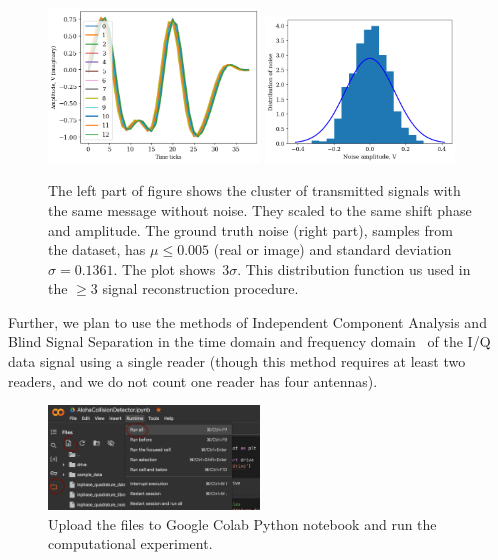 \documentclass[12pt]{article}
\begin{document}
\begin{figure}[!h]
\centering
\includegraphics[width=0.5\textwidth]{fig_cluster}
\includegraphics[width=0.45\textwidth]{fig_noise_pdf}
\caption{The left part of figure shows the cluster of transmitted signals with the same message without noise. They scaled to the same shift phase and amplitude.  The ground truth noise (right part), samples from the dataset, has $\mu\leq 0.005$ (real or image) and standard deviation~$\sigma =  0.1361$. The plot shows~$3 \sigma$. This distribution function us used in the $\geq 3$ signal reconstruction procedure. }  %
\label{fig:demo}
\end{figure}

Further, we plan to use the methods of Independent Component Analysis and Blind Signal Separation in the time domain and frequency domain~\cite{Hyvaerinen2000,Elliott1999} of the I/Q data signal using a single reader (though this method requires at least two readers, and we do not count one reader has four antennas). 

\begin{figure}[!h]
\centering
\includegraphics[width=0.5\textwidth]{fig_demo_upload}
\caption{Upload the files to Google Colab Python notebook and run the computational experiment.}
\label{fig:demo}
\end{figure}
\end{document}
